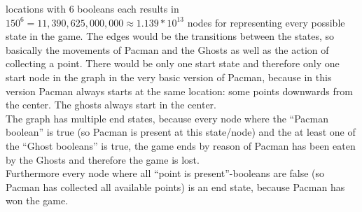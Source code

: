 \documentclass[10pt,a4paper]{article}
\begin{document}
		 locations with 6 booleans each results in $150^6 = 11,390,625,000,000 \approx 1.139*10^{13}$ nodes for representing every possible state in the game. The edges would be the transitions between the states, so basically the movements of Pacman and the Ghosts as well as the action of collecting a point. There would be only one start state and therefore only one start node in the graph in the very basic version of Pacman, because in this version Pacman always starts at the same location: some points downwards from the center. The ghosts always start in the center.
		\\
		The graph has multiple end states, because every node where the \enquote{Pacman boolean} is true (so Pacman is present at this state/node) and the at least one of the \enquote{Ghost booleans} is true, the game ends by reason of Pacman has been eaten by the Ghosts and therefore the game is lost.
		\\
		Furthermore every node where all \enquote{point is present}-booleans are false (so Pacman has collected all available points) is an end state, because Pacman has won the game.
		
		
\end{document}

